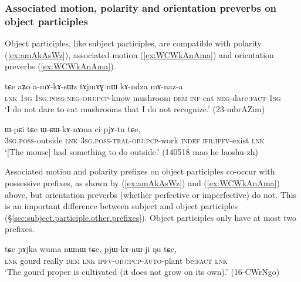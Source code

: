 \subsubsection{Associated motion, polarity and orientation preverbs on object participles}  \label{sec:object.participle.other.prefixes}
Object participles, like subject participles, are compatible with polarity (\ref{ex:amAkAsWz}), associated motion (\ref{ex:WCWkAnAma}) and orientation preverbs (\ref{ex:WCWkAnAma}).

\begin{exe}
\ex  \label{ex:amAkAsWz}
\gll tɕe aʑo a-mɤ-kɤ-sɯz tɤjmɤɣ nɯ kɤ-ndza mɤ-naz-a \\
\textsc{lnk} \textsc{1sg} \textsc{1sg}.\textsc{poss}-\textsc{neg}-\textsc{obj}:\textsc{pcp}-know mushroom \textsc{dem} \textsc{inf}-eat \textsc{neg}-dare:\textsc{fact}-\textsc{1sg}  \\
\glt `I do not dare to eat mushrooms that I do not recognize.' (23-mbrAZim)
\end{exe}

\begin{exe}
\ex  \label{ex:WCWkAnAma}
\gll ɯ-pɕi tɕe ɯ-ɕɯ-kɤ-nɤma ci pjɤ-tu tɕe, \\
\textsc{3sg}.\textsc{poss}-outside \textsc{lnk} \textsc{3sg}.\textsc{poss}-\textsc{tral}-\textsc{obj}:\textsc{pcp}-work \textsc{indef} \textsc{ifr}.\textsc{ipfv}-exist \textsc{lnk} \\
\glt  `[The mouse] had something to do outside.' (140518 mao he laoshu-zh)
\end{exe}

Associated motion and polarity prefixes on object participles co-occur with possessive prefixes, as shown by  (\ref{ex:amAkAsWz}) and  (\ref{ex:WCWkAnAma})  above, but orientation preverbs (whether perfective or imperfective) do not. This is an important difference between subject and object participles (§\ref{sec:subject.participle.other.prefixes}). Object participles only have at most two prefixes.

\begin{exe}
\ex  \label{ex:pjWKAnWji}
\gll tɕe pɤjka wuma nɯnɯ tɕe, pjɯ-kɤ-nɯ-ji ŋu tɕe, \\
\textsc{lnk} gourd really \textsc{dem} \textsc{lnk} \textsc{ipfv}-\textsc{obj}:\textsc{pcp}-\textsc{auto}-plant be:\textsc{fact} \textsc{lnk} \\
\glt `The gourd proper is cultivated (it does not grow on its own).' (16-CWrNgo) 
\end{exe}

